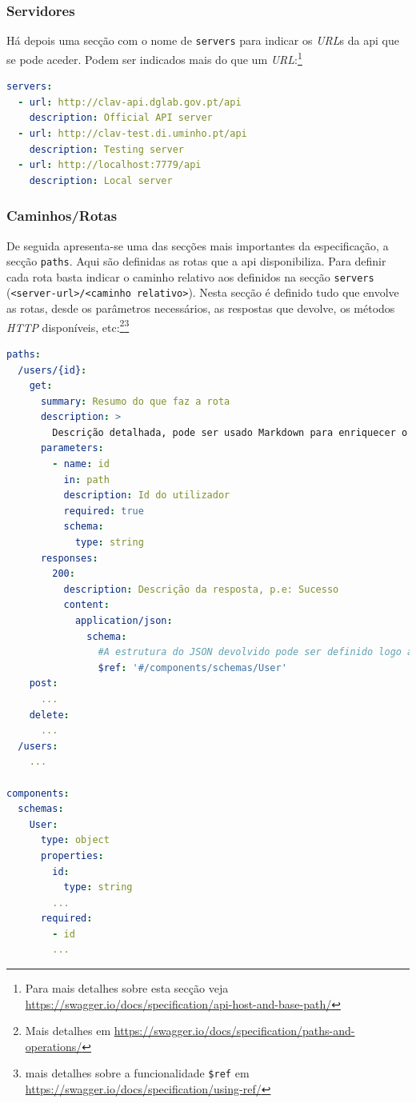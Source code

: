 \subsubsection{Servidores}
Há depois uma secção com o nome de \texttt{servers} para indicar os \textit{URL}s da \acrshort{api} que se pode aceder. Podem ser indicados mais do que um \textit{URL}:\footnote{Para mais detalhes sobre esta secção veja \url{https://swagger.io/docs/specification/api-host-and-base-path/}}
\begin{lstlisting}[language=yaml, caption=Exemplo de secção \texttt{servers} indicando os \textit{URL}s e a descrição de cada na especificação \textit{OpenAPI}]
servers:
  - url: http://clav-api.dglab.gov.pt/api
    description: Official API server
  - url: http://clav-test.di.uminho.pt/api
    description: Testing server
  - url: http://localhost:7779/api
    description: Local server
\end{lstlisting}

\subsubsection{Caminhos/Rotas}
De seguida apresenta-se uma das secções mais importantes da especificação, a secção \texttt{paths}. Aqui são definidas as rotas que a \acrshort{api} disponibiliza. Para definir cada rota basta indicar o caminho relativo aos definidos na secção \texttt{servers} (\verb|<server-url>/<caminho relativo>|). Nesta secção é definido tudo que envolve as rotas, desde os parâmetros necessários, as respostas que devolve, os métodos \textit{HTTP} disponíveis, etc:\footnote{Mais detalhes em \url{https://swagger.io/docs/specification/paths-and-operations/}}\footnote{mais detalhes sobre a funcionalidade \texttt{\$ref} em \url{https://swagger.io/docs/specification/using-ref/}}
\begin{lstlisting}[language=yaml, caption=Exemplo de secção \texttt{paths} indicando os detalhes de cada rota na especificação \textit{OpenAPI}, label={exem:oapiRota}]
paths:
  /users/{id}:
    get:
      summary: Resumo do que faz a rota
      description: >
        Descrição detalhada, pode ser usado Markdown para enriquecer o texto
      parameters:
        - name: id
          in: path
          description: Id do utilizador
          required: true
          schema:
            type: string
      responses:
        200:
          description: Descrição da resposta, p.e: Sucesso
          content:
            application/json:
              schema:
                #A estrutura do JSON devolvido pode ser definido logo aqui ou num componente à parte, fazendo referência desse. Iremos aplicar o segundo caso para demonstrar que estas funcionalidades tornam a documentação mais fácil de manter
                $ref: '#/components/schemas/User'
    post:
      ...
    delete:
      ...
  /users:
    ...

components:
  schemas:
    User:
      type: object
      properties:
        id:
          type: string
        ...
      required:
        - id
        ...
\end{lstlisting}

